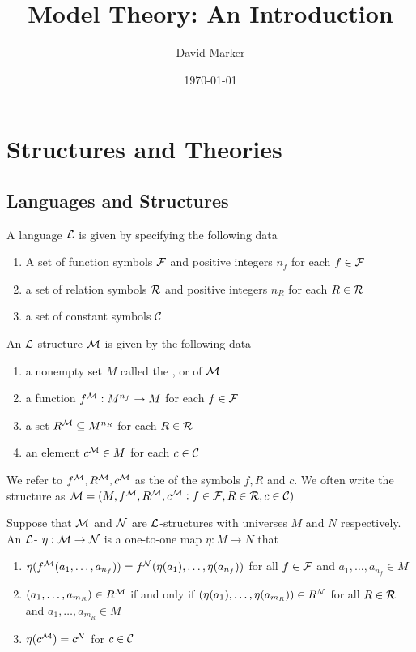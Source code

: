 \documentclass[11pt]{article}
\author{David Marker}
\date{\today}
\title{Model Theory: An Introduction}
\begin{document}
\maketitle
\tableofcontents \clearpage\section{Structures and Theories}
\label{sec:org6738c7f}
\subsection{Languages and Structures}
\label{sec:orgf6c2423}
\begin{definition}[]
A language \(\mathcal{L}\) is given by specifying the following data
\begin{enumerate}
\item A set of function symbols \(\mathcal{F}\) and positive integers \(n_f\) for each
\(f\in\mathcal{F}\)
\item a set of relation symbols \(\mathcal{R}\) and positive integers \(n_R\) for each
\(R\in\mathcal{R}\)
\item a set of constant symbols \(\mathcal{C}\)
\end{enumerate}
\end{definition}

\begin{definition}[]
An \(\mathcal{L}\)-structure \(\mathcal{M}\) is given by the following data
\begin{enumerate}
\item a nonempty set \(M\) called the ,  or 
of \(\mathcal{M}\)
\item a function \(f^{\mathcal{M}}:M^{n_f}\to M\) for each \(f\in\mathcal{F}\)
\item a set \(R^{\mathcal{M}}\subseteq M^{n_R}\) for each \(R\in\mathcal{R}\)
\item an element \(c^{\mathcal{M}}\in M\) for each \(c\in\mathcal{C}\)
\end{enumerate}
\end{definition}

We refer to \(f^{\mathcal{M}},R^{\mathcal{M}},c^{\mathcal{M}}\) as the  of the
symbols \(f,R\) and \(c\). We often write the structure as
\(\mathcal{M}=(M,f^{\mathcal{M}},R^{\mathcal{M}},c^{\mathcal{M}}:f\in\mathcal{F},R\in\mathcal{R},c\in\mathcal{C})\) 

\begin{definition}[]
Suppose that \(\mathcal{M}\) and \(\mathcal{N}\) are \(\mathcal{L}\)-structures with universes \(M\)
and \(N\) respectively. An \(\mathcal{L}\)- \(\eta:\mathcal{M}\to\mathcal{N}\) is a
one-to-one map \(\eta:M\to N\) that
\begin{enumerate}
\item \(\eta(f^{\mathcal{M}}(a_1,\dots,a_{n_f}))=f^{\mathcal{N}}(\eta(a_1),\dots,\eta(a_{n_f}))\)
for all \(f\in\mathcal{F}\) and \(a_1,\dots,a_{n_f}\in M\)
\item \((a_1,\dots,a_{m_R})\in R^{\mathcal{M}}\) if and only if
\((\eta(a_1),\dots,\eta(a_{m_R}))\in R^{\mathcal{N}}\) for all \(R\in\mathcal{R}\) and
\(a_1,\dots,a_{m_R}\in M\)
\item \(\eta(c^{\mathcal{M}})=c^{\mathcal{N}}\) for \(c\in\mathcal{C}\)
\end{enumerate}
\end{definition}
\end{document}
